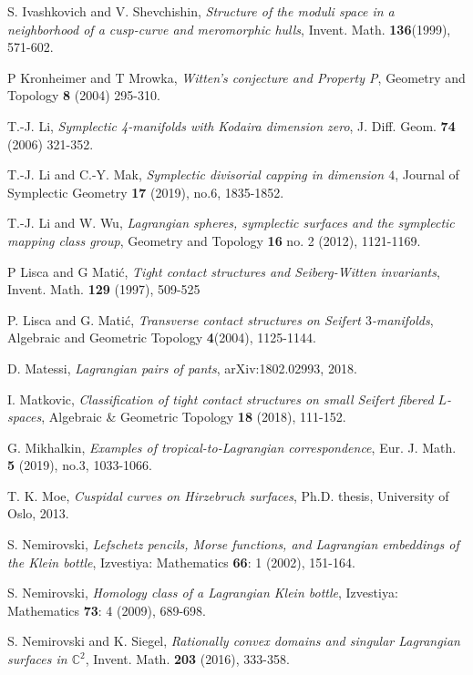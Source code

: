 \documentclass[11pt]{amsart}
\theoremstyle{plain}
\numberwithin{theorem}{section}
\theoremstyle{definition}
\newcommand{\C}{{\mathbb C}}
\begin{document}
\begin{thebibliography}{}
 S. Ivashkovich and V. Shevchishin, {\em Structure of the moduli space in a 
neighborhood of a cusp-curve and meromorphic hulls}, Invent. Math. {\bf 136}(1999), 571-602. 

 P Kronheimer and T Mrowka, {\em Witten’s conjecture and Property P},
Geometry and Topology {\bf 8} (2004) 295-310.

 T.-J. Li, {\em Symplectic 4-manifolds with Kodaira dimension zero}, 
J. Diff. Geom. {\bf 74} (2006) 321-352.

 T.-J. Li and C.-Y. Mak, {\em Symplectic divisorial capping in dimension $4$}, 
Journal of Symplectic Geometry {\bf 17} (2019), no.6, 1835-1852.

T.-J. Li  and W. Wu, {\em Lagrangian spheres, symplectic surfaces and the symplectic mapping class group}, Geometry and Topology {\bf 16} no. 2 (2012), 1121-1169. 


 P Lisca and G Mati\'{c}, {\em Tight contact structures and Seiberg-Witten invariants},
Invent. Math. {\bf 129} (1997), 509-525

 P. Lisca and G. Mati\'{c}, {\em Transverse contact structures on Seifert $3$-manifolds},
Algebraic and Geometric Topology {\bf 4}(2004), 1125-1144. 


 D. Matessi, {\em Lagrangian pairs of pants},  arXiv:1802.02993, 2018.

 I. Matkovic, {\em Classification of tight contact structures on small Seifert fibered 
$L$-spaces}, Algebraic \& Geometric Topology {\bf 18} (2018), 111-152.

 G. Mikhalkin, {\em Examples of tropical-to-Lagrangian correspondence}, Eur. J.
Math. {\bf 5} (2019), no.3, 1033-1066. 

 T. K. Moe, {\em Cuspidal curves on Hirzebruch surfaces}, Ph.D. thesis, University of Oslo, 2013. 

 S. Nemirovski, {\em Lefschetz pencils, Morse functions, and Lagrangian 
embeddings of the Klein bottle}, Izvestiya: Mathematics {\bf 66}: 1 (2002), 151-164.

 S. Nemirovski, {\em Homology class of a Lagrangian Klein bottle}, Izvestiya: Mathematics {\bf 73}: 4 (2009), 689-698.

 S. Nemirovski and K. Siegel, {\em Rationally convex domains and singular Lagrangian surfaces in $\C^2$}, Invent. Math. {\bf 203} (2016), 333-358.


\end{thebibliography}
\end{document}
